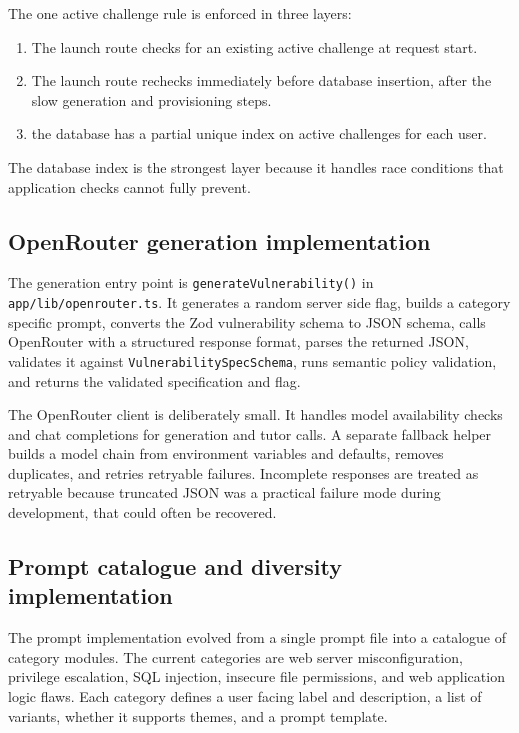 The one active challenge rule is enforced in three layers:
\begin{enumerate}
	\item The launch route checks for an existing active challenge at request start.
	\item The launch route rechecks immediately before database insertion, after the slow generation and provisioning steps.
	\item the database has a partial unique index on active challenges for each user.
\end{enumerate}
The database index is the strongest layer because it handles race conditions that application checks cannot fully prevent.

\subsection{OpenRouter generation implementation}\label{sec:openrouter-implementation}

The generation entry point is \lstinline|generateVulnerability()| in \lstinline|app/lib/openrouter.ts|. It generates a random server side flag, builds a category specific prompt, converts the Zod vulnerability schema to JSON schema, calls OpenRouter with a structured response format, parses the returned JSON, validates it against \lstinline|VulnerabilitySpecSchema|, runs semantic policy validation, and returns the validated specification and flag.

The OpenRouter client is deliberately small. It handles model availability checks and chat completions for generation and tutor calls. A separate fallback helper builds a model chain from environment variables and defaults, removes duplicates, and retries retryable failures. Incomplete responses are treated as retryable because truncated JSON was a practical failure mode during development, that could often be recovered.

\subsection{Prompt catalogue and diversity implementation}\label{sec:prompt-catalogue}

The prompt implementation evolved from a single prompt file into a catalogue of category modules. The current categories are web server misconfiguration, privilege escalation, SQL injection, insecure file permissions, and web application logic flaws. Each category defines a user facing label and description, a list of variants, whether it supports themes, and a prompt template.

